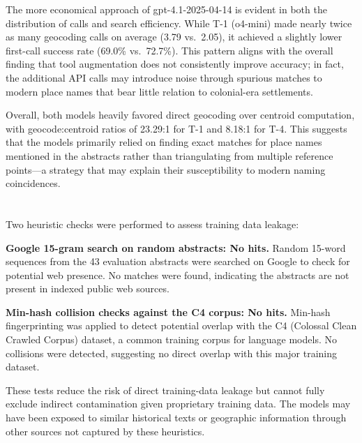 The more economical approach of gpt-4.1-2025-04-14 is evident in both
the distribution of calls and search efficiency. While T-1 (o4-mini)
made nearly twice as many geocoding calls on average (3.79 vs.~2.05), it
achieved a slightly lower first-call success rate (69.0\% vs.~72.7\%).
This pattern aligns with the overall finding that tool augmentation does
not consistently improve accuracy; in fact, the additional API calls may
introduce noise through spurious matches to modern place names that bear
little relation to colonial-era settlements.

Overall, both models heavily favored direct geocoding over centroid
computation, with geocode:centroid ratios of 23.29:1 for T-1 and 8.18:1
for T-4. This suggests that the models primarily relied on finding exact
matches for place names mentioned in the abstracts rather than
triangulating from multiple reference points---a strategy that may
explain their susceptibility to modern naming coincidences.

\DIFdelbegin \subsubsection{}%
\addtocounter{subsubsection}{-1}%
\DIFdelend \DIFaddbegin \section{}\label{appendix-e-leakage-audit}
\DIFaddend 

Two heuristic checks were performed to assess training data leakage:

\textbf{Google 15-gram search on random abstracts: No hits.} Random
15-word sequences from the 43 evaluation abstracts were searched on
Google to check for potential web presence. No matches were found,
indicating the abstracts are not present in indexed public web sources.

\textbf{Min-hash collision checks against the C4 corpus: No hits.}
Min-hash fingerprinting was applied to detect potential overlap with the
C4 (Colossal Clean Crawled Corpus) dataset, a common training corpus for
language models. No collisions were detected, suggesting no direct
overlap with this major training dataset.

These tests reduce the risk of direct training-data leakage but cannot
fully exclude indirect contamination given proprietary training data.
The models may have been exposed to similar historical texts or
geographic information through other sources not captured by these
heuristics.
